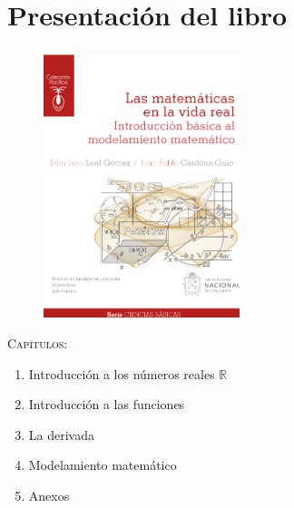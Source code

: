 
\section{Presentación del libro}

\begin{frame}
	\frametitle{\secname}%
	\begin{minipage}{0.47\textwidth}
		\begin{figure}[ht!]
			\centering
			\includegraphics[height=7.7cm]{portada}
		\end{figure}
	\end{minipage}%
	\begin{minipage}{0.5\textwidth}
		\textsc{\large Capítulos:}
		\begin{enumerate}
			\item Introducción a los números reales $\mathbb{R}$
			\item Introducción a las funciones
			\item La derivada
			\item Modelamiento matemático
			\item Anexos
		\end{enumerate}
	\end{minipage}

\end{frame}

